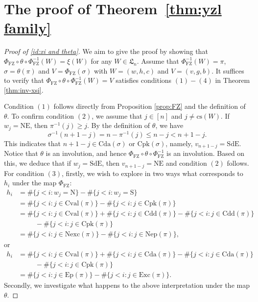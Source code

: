 \documentclass[12pt]{amsart}
\numberwithin{equation}{section}
\theoremstyle{plain}
\theoremstyle{definition}
\def\FZ{\mathrm{FZ}}
\def\LH{\mathfrak{L}}
\def\N{\mathrm{N}}
\def\S{\mathrm{S}}
\def\NE{\mathrm{NE}}
\def\SdE{\mathrm{SdE}}
\def\cs{\mathrm{cs}}
\def\Excp{\mathrm{Ep}}
\def\Exc{\mathrm{Exc}}
\def\Nexc{\mathrm{Nexc}}
\def\Nexcp{\mathrm{Nep}}
\def\Cpk{\mathrm{Cpk}}
\def\Cval{\mathrm{Cval}}
\def\Cda{\mathrm{Cda}}
\def\Cdd{\mathrm{Cdd}}
\begin{document}
\section{The proof of Theorem~\ref{thm:yzl family}}\label{sec:appendix}
\begin{proof}[Proof of \eqref{id:xi and theta}]

We aim to give the proof by showing  that $\Phi_{\FZ} \circ \theta \circ \Phi_{\FZ}^{-1}(W)=\xi(W)$ for any $W\in \LH_n$.
Assume that $\Phi_{\FZ}^{-1}(W)=\pi$, $\sigma=\theta(\pi)$ and $V=\Phi_{\FZ}(\sigma)$ with $W=(w,h,c)$ and $V=(v,g,b)$.
It suffices to verify that $\Phi_{\FZ} \circ \theta \circ \Phi_{\FZ}^{-1}(W)=V$ satisfies conditions $(1) - (4)$ in Theorem \ref{thm:inv-xsi}.

Condition $(1)$ follows directly from Proposition
\ref{prop:FZ} and the definition of $\theta$.  To confirm condition $(2)$,  we assume that $j \in [n]$ and $j \neq \cs(W)$.
If $w_j=\NE$, then $\pi^{-1}(j) \geq j$. By the definition of $\theta$,
we have
\[ \sigma^{-1}(n+1-j) = n-\pi^{-1}(j) \leq n-j <n+1-j.\]
This indicates that $n+1-j \in \Cda(\sigma)$ or $\Cpk(\sigma)$,
namely, $v_{n+1-j}=\SdE$. Notice that $\theta$ is an involution, and hence $\Phi_{\FZ} \circ \theta \circ \Phi_{\FZ}^{-1}$ is an involution.
Based on this, 
we deduce that if $w_j=\SdE$, then $v_{n+1-j}=\NE$ and condition $(2)$
follows.
For condition $(3)$, firstly, we wish to explore in two ways what corresponds to $h_i$ under the map $\Phi_{\FZ}$:
\begin{align*}
  h_i & =\#\{j<i: w_j=\N\}- \#\{j<i: w_j=\S\}\\[3pt]
    & =\#\{j<i: j \in \Cval(\pi)\}- \#\{j<i: j \in \Cpk(\pi)\}\\[3pt]
     & =\#\{j<i: j \in \Cval(\pi)\}+\#\{j<i: j \in \Cdd(\pi)\}-\#\{j<i: j \in \Cdd(\pi)\}\\[3pt]
     &\,\,\,\,\,\,\,\,\,\,\,\,\,\,\,- \#\{j<i: j \in \Cpk(\pi)\}\\
     & =\#\{j<i: j \in \Nexc(\pi)\}-\#\{j<i: j \in \Nexcp(\pi)\},
\end{align*}
or
\begin{align*}
     h_i  & =\#\{j<i: j \in \Cval(\pi)\}+\#\{j<i: j \in \Cda(\pi)\}-\#\{j<i: j \in \Cda(\pi)\}\\[3pt]
     &\,\,\,\,\,\,\,\,\,\,\,\,\,\,\,- \#\{j<i: j \in \Cpk(\pi)\}\\
     & =\#\{j<i: j \in \Excp(\pi)\}-\#\{j<i: j \in \Exc(\pi)\}.
\end{align*}
Secondly, we investigate what happens to the above interpretation under the map $\theta$.

\end{proof}
\end{document}
